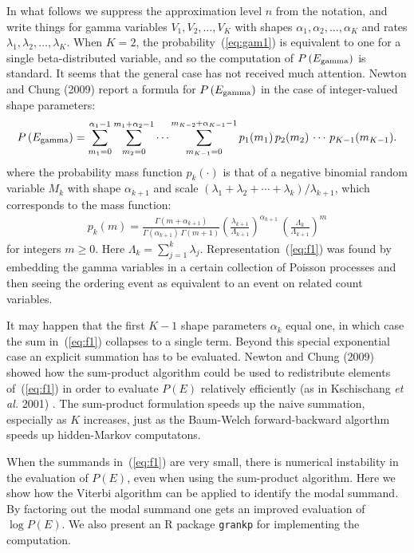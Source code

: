 In what follows we suppress the approximation level $n$ from the notation, 
and write things for
gamma variables $V_1, V_2, \ldots, V_K$ with shapes $\alpha_1, 
\alpha_2, \ldots, \alpha_K$ and rates $\lambda_1, \lambda_2, \ldots,
 \lambda_K$.
 When $K=2$, the probability~(\ref{eq:gam1}) 
 is equivalent to one for a single beta-distributed
 variable, and so the computation of
  $P\left(E_{\rm gamma}\right)$ is standard.  It seems that
 the general case has not received much attention.
  Newton and Chung (2009) report a formula
 for $P\left(E_{\rm gamma}\right)$ 
 in the case of integer-valued shape parameters:
\begin{eqnarray}
\label{eq:f1}
P\left(E_{\rm gamma} \right) = \sum_{m_1=0}^{\alpha_1 - 1} 
 \sum_{m_2=0}^{m_1+\alpha_2 -1 }
   \cdots \sum_{m_{K-1} = 0 }^{m_{K-2} + \alpha_{K-1} - 1 }
   p_1(m_1) \, p_2(m_2) \, \cdots \, p_{K-1}(m_{K-1}).
\end{eqnarray}
where the probability mass function $p_k(\cdot)$ is that of a
negative binomial random variable $M_k$ with shape $\alpha_{k+1}$ and
 scale $( \lambda_1 + \lambda_2 + \cdots + \lambda_k )/\lambda_{k+1}$,
which corresponds to the mass function:
\begin{eqnarray}
\label{eq:nb}
p_k(m) = \frac{ \Gamma( m+\alpha_{k+1} ) }{ \Gamma( \alpha_{k+1} )
  \, \Gamma(m+1) }
         \left( \frac{\lambda_{k+1}}{\Lambda_{k+1}} \right)^{\alpha_{k+1}} \,
         \left( \frac{\Lambda_k}{\Lambda_{k+1} } \right)^{m} 
\end{eqnarray}
for integers $m \geq 0$. Here $\Lambda_k = \sum_{j=1}^k \lambda_j$.
Representation~(\ref{eq:f1}) was found by embedding the gamma variables
in a certain collection of Poisson processes and then seeing the ordering
event as equivalent to an event on related count variables.  

It may happen that the first $K-1$ shape parameters $\alpha_k$ equal one,
in which case the sum in~(\ref{eq:f1}) collapses to a single term.
Beyond this special 
exponential case an explicit summation has to be evaluated.
Newton and Chung (2009) showed how the sum-product algorithm could be
used to redistribute elements of~(\ref{eq:f1}) in order to evaluate
$P(E)$ relatively efficiently (as in Kschischang {\em et al.} 2001) . 
The sum-product formulation speeds
up the naive summation, especially as $K$ increases, just as
the Baum-Welch forward-backward algorthm speeds up hidden-Markov
computatons.

When the summands in~(\ref{eq:f1})  are very small, there is
numerical instability in the evaluation of $P(E)$, even when
using the sum-product algorithm.  
Here we show how the Viterbi algorithm can be applied to 
identify the modal summand.  By factoring out the modal summand 
one gets an improved evaluation of $\log P(E)$. 
We also present an R package \verb+grankp+ for implementing the computation.


